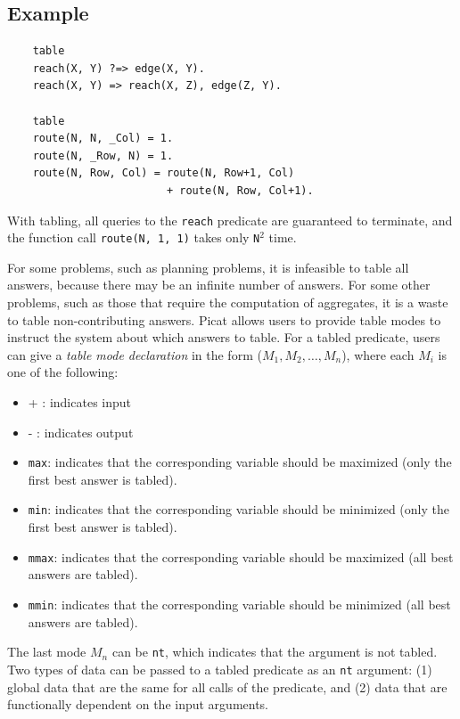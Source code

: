 \subsection*{Example}
\begin{verbatim}
    table
    reach(X, Y) ?=> edge(X, Y).
    reach(X, Y) => reach(X, Z), edge(Z, Y).

    table
    route(N, N, _Col) = 1.
    route(N, _Row, N) = 1.
    route(N, Row, Col) = route(N, Row+1, Col)
                         + route(N, Row, Col+1).
\end{verbatim}
With tabling, all queries to the \texttt{reach} predicate are guaranteed to terminate, and the function call \texttt{route(N, 1, 1)} takes only \texttt{N}$^2$ time.

For some problems, such as planning problems, it is infeasible to table all answers, because there may be an infinite number of answers. For some other problems, such as those that require the computation of aggregates, it is a waste to table non-contributing answers. Picat allows users to provide table modes to instruct the system about which answers to table. For a tabled predicate, users can give a \emph{table mode declaration} in the form ($M_{1}, M_{2}, \ldots, M_{n}$), where each $M_{i}$ is one of the following: 
\begin{itemize}
\item + : indicates input
\item - : indicates output
\item \texttt{max}: indicates that the corresponding variable should be maximized (only the first best answer is tabled).
\item \texttt{min}: indicates that the corresponding variable should be minimized (only the first best answer is tabled).
\item \texttt{mmax}: indicates that the corresponding variable should be maximized (all best answers are tabled).
\item \texttt{mmin}: indicates that the corresponding variable should be minimized (all best answers are tabled).
\end{itemize}
The last mode $M_{n}$ can be \texttt{nt}, which indicates that the argument is not tabled. Two types of data can be passed to a tabled predicate as an \texttt{nt} argument: (1) global data that are the same for all calls of the predicate, and (2) data that are functionally dependent on the input arguments.

